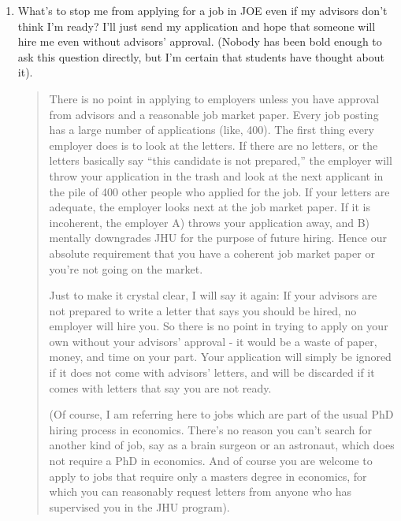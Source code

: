 \documentclass{\classes/econtex}
\begin{document}
\begin{enumerate}
\begin{quote}
    You can't go on the job market twice (with support from JHU, anyway; and, you won't
    get a job without support from JHU).

  \end{quote}
\item  What's to stop me from applying for a job in JOE even if my advisors don't think I'm ready?  I'll just send my application and hope that someone will hire me even without advisors' approval.  (Nobody has been bold enough to ask this question directly, but I'm certain that students have thought about it).

  \begin{quote}
    There is no point in applying to employers unless you have approval from advisors and a reasonable job market paper.  Every job posting has a large number of applications (like, 400).  The first thing every employer does is to look at the letters.  If there are no letters, or the letters basically say ``this candidate is not prepared,'' the employer will throw your application in the trash and look at the next applicant in the pile of 400 other people who applied for the job.  If your letters are adequate, the employer looks next at the job market paper.  If it is incoherent, the employer A) throws your application away, and B) mentally downgrades JHU for the purpose of future hiring.  Hence our absolute requirement that you have a coherent job market paper or you're not going on the market.

    Just to make it crystal clear, I will say it again: If your advisors
    are not prepared to write a letter that says you should be hired, no
    employer will hire you.  So there is no point in trying to apply on
    your own without your advisors' approval - it would be a waste of
    paper, money, and time on your part.  Your application will simply be
    ignored if it does not come with advisors' letters, and will be discarded
    if it comes with letters that say you are not ready.

    (Of course, I am referring here to jobs which are part of the usual PhD hiring process in economics.  There's no reason you can't search for another kind of job, say as a brain surgeon or an astronaut, which does not require a PhD in economics.  And of course you are welcome to apply to jobs that require only a masters degree in economics, for which you can reasonably request letters from anyone who has supervised you in the JHU program).

  \end{quote}
\end{enumerate}
\end{document}
